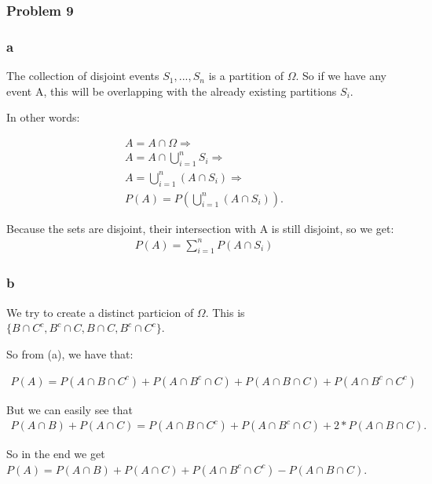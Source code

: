 \documentclass{article}
\begin{document}
\subsubsection*{Problem 9}

\subsubsection*{a}

The collection of disjoint events $S_{1},...,S_{n}$ is a partition of $\Omega$.
So if we have any event A, this will be overlapping with the already existing partitions $S_{i}$. 

In other words:

\begin{gather*}
    A = A \cap \Omega \Rightarrow \\
    A = A \cap \bigcup_{i=1}^{n}S_{i} \Rightarrow \\
    A = \bigcup_{i=1}^{n}(A \cap S_{i}) \Rightarrow \\
    P(A) = P(\bigcup_{i=1}^{n}(A \cap S_{i})).
\end{gather*}

Because the sets are disjoint, their intersection with A is still disjoint, so we get:
\begin{gather*}
    P(A) = \sum_{i=1}^{n}P(A \cap S_{i})    
\end{gather*}

\subsubsection*{b}

We try to create a distinct particion of $\Omega$. This is $\{B\cap C^{c}, B^{c} \cap C, B \cap C, B^{c} \cap C^{c}\}$.

So from (a), we have that:

\begin{gather*}
    P(A) = P(A \cap B\cap C^{c}) + P(A \cap B^{c} \cap C) + P(A \cap B \cap C) + P(A \cap B^{c} \cap C^{c})
\end{gather*}

But we can easily see that
\begin{gather*}
    P(A \cap B) + P(A \cap C) = P(A \cap B\cap C^{c}) + P(A \cap B^{c} \cap C) + 2 * P(A \cap B \cap C).
\end{gather*}

So in the end we get $P(A) = P(A \cap B) + P(A \cap C) + P(A \cap B^{c} \cap C^{c}) - P(A \cap B \cap C)$.
\end{document}
